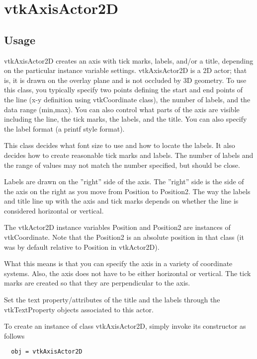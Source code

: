 \section{vtkAxisActor2D}

\subsection{Usage}

 vtkAxisActor2D creates an axis with tick marks, labels, and/or a title,
 depending on the particular instance variable settings. vtkAxisActor2D is
 a 2D actor; that is, it is drawn on the overlay plane and is not
 occluded by 3D geometry. To use this class, you typically specify two
 points defining the start and end points of the line (x-y definition using
 vtkCoordinate class), the number of labels, and the data range
 (min,max). You can also control what parts of the axis are visible
 including the line, the tick marks, the labels, and the title.  You can 
 also specify the label format (a printf style format).

 This class decides what font size to use and how to locate the labels. It
 also decides how to create reasonable tick marks and labels. The number
 of labels and the range of values may not match the number specified, but
 should be close.

 Labels are drawn on the ''right'' side of the axis. The ''right'' side is
 the side of the axis on the right as you move from Position to Position2. 
 The way the labels and title line up with the axis and tick marks depends on
 whether the line is considered horizontal or vertical.

 The vtkActor2D instance variables Position and Position2 are instances of 
 vtkCoordinate. Note that the Position2 is an absolute position in that 
 class (it was by default relative to Position in vtkActor2D).

 What this means is that you can specify the axis in a variety of coordinate
 systems. Also, the axis does not have to be either horizontal or vertical.
 The tick marks are created so that they are perpendicular to the axis.

 Set the text property/attributes of the title and the labels through the 
 vtkTextProperty objects associated to this actor.


To create an instance of class vtkAxisActor2D, simply
invoke its constructor as follows
\begin{verbatim}
  obj = vtkAxisActor2D
\end{verbatim}
